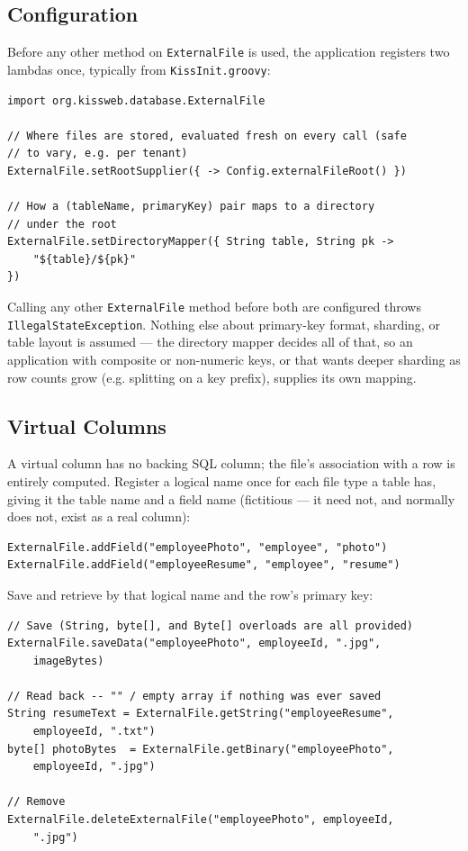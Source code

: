 \subsection{Configuration}
\label{sec:file-external-config}

Before any other method on \texttt{ExternalFile} is used, the application registers two lambdas once, typically from \texttt{KissInit.groovy}:

\begin{lstlisting}[style=groovy]
import org.kissweb.database.ExternalFile

// Where files are stored, evaluated fresh on every call (safe
// to vary, e.g. per tenant)
ExternalFile.setRootSupplier({ -> Config.externalFileRoot() })

// How a (tableName, primaryKey) pair maps to a directory
// under the root
ExternalFile.setDirectoryMapper({ String table, String pk ->
    "${table}/${pk}"
})
\end{lstlisting}

\noindent
Calling any other \texttt{ExternalFile} method before both are configured throws \texttt{IllegalStateException}. Nothing else about primary-key format, sharding, or table layout is assumed --- the directory mapper decides all of that, so an application with composite or non-numeric keys, or that wants deeper sharding as row counts grow (e.g. splitting on a key prefix), supplies its own mapping.

\subsection{Virtual Columns}
\label{sec:file-external-virtual}

A virtual column has no backing SQL column; the file's association with a row is entirely computed. Register a logical name once for each file type a table has, giving it the table name and a field name (fictitious --- it need not, and normally does not, exist as a real column):

\begin{lstlisting}[style=groovy]
ExternalFile.addField("employeePhoto", "employee", "photo")
ExternalFile.addField("employeeResume", "employee", "resume")
\end{lstlisting}

\noindent
Save and retrieve by that logical name and the row's primary key:

\begin{lstlisting}[style=groovy]
// Save (String, byte[], and Byte[] overloads are all provided)
ExternalFile.saveData("employeePhoto", employeeId, ".jpg",
    imageBytes)

// Read back -- "" / empty array if nothing was ever saved
String resumeText = ExternalFile.getString("employeeResume",
    employeeId, ".txt")
byte[] photoBytes  = ExternalFile.getBinary("employeePhoto",
    employeeId, ".jpg")

// Remove
ExternalFile.deleteExternalFile("employeePhoto", employeeId,
    ".jpg")
\end{lstlisting}

